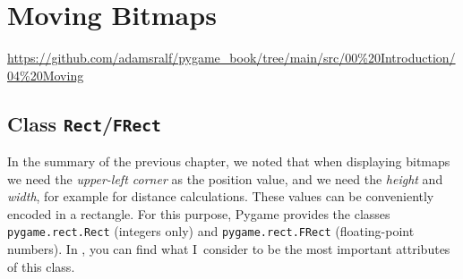 \newpage
\section{Moving Bitmaps}\label{secMoving}
\begin{diskbox}
	\url{https://github.com/adamsralf/pygame_book/tree/main/src/00%20Introduction/04%20Moving}
\end{diskbox}
\subsection{Class \texttt{Rect}/\texttt{FRect}}\label{secRect}
 In the summary of the previous chapter, we noted that when displaying bitmaps we need the \emph{upper-left corner} as the position value, and we need the \emph{height} and \emph{width}, for example for distance calculations. These values can be conveniently encoded in a rectangle. For this purpose, Pygame provides the classes \texttt{pygame.rect.Rect} (integers only) and \texttt{pygame.rect.FRect} (floating-point numbers). In , you can find what I~consider to be the most important attributes of this class.

